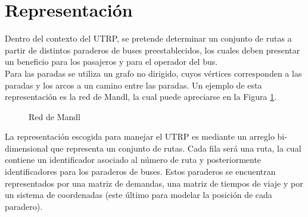 \section{Representación}

Dentro del contexto del UTRP, se pretende determinar un conjunto de rutas a partir de distintos paraderos de buses preestablecidos, los cuales deben presentar un beneficio para los pasajeros y para el operador del bus.\\

Para las paradas se utiliza un grafo no dirigido, cuyos vértices corresponden a las paradas y los arcos a un camino entre las paradas. Un ejemplo de esta representación es la red de Mandl, la cual puede apreciarse en la Figura \ref{fig:mandl}.

\begin{figure}[!htb]
\begin{center}
\caption{Red de Mandl}
\label{fig:mandl}
\end{center}
\end{figure}

La representación escogida para manejar el UTRP es mediante un arreglo bi-dimensional que representa un conjunto de rutas. Cada fila será una ruta, la cual contiene un identificador asociado al número de ruta y posteriormente identificadores para los paraderos de buses. Estos paraderos se encuentran representados por una matriz de demandas, una matriz de tiempos de viaje y por un sistema de coordenadas (este último para modelar la posición de cada paradero).

